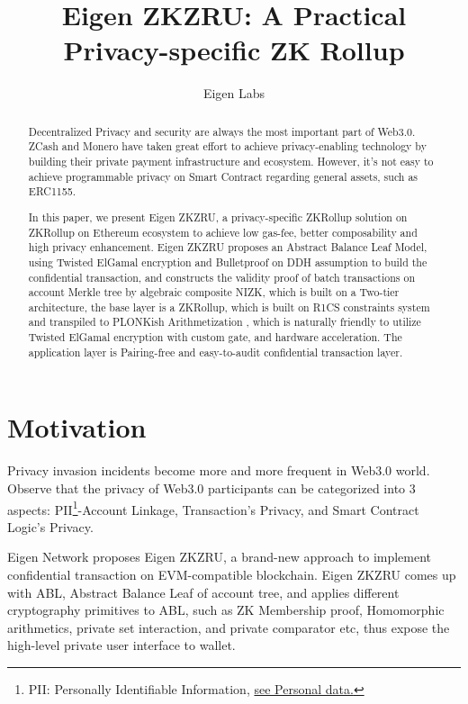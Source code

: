 \documentclass{article}
\title{Eigen ZKZRU: A Practical Privacy-specific ZK Rollup}
\author{Eigen Labs}
\begin{document}
\maketitle


\begin{abstract}
Decentralized Privacy and security are always the most important part of Web3.0. ZCash and Monero have taken great effort to achieve privacy-enabling technology by building their private payment infrastructure and ecosystem. However, it's not easy to achieve programmable privacy on Smart Contract regarding general assets, such as ERC1155.

In this paper, we present Eigen ZKZRU, a privacy-specific ZKRollup solution on ZKRollup on Ethereum ecosystem to achieve low gas-fee, better composability and high privacy enhancement. Eigen ZKZRU proposes an Abstract Balance Leaf Model, using Twisted ElGamal encryption \cite{chen2020pgc} and Bulletproof \cite{bunz2018bulletproofs} on DDH assumption to build the confidential transaction, and constructs the validity proof of batch transactions on account Merkle tree by algebraic composite NIZK, which is built on a Two-tier architecture, the base layer is a ZKRollup, which is built on R1CS constraints system and transpiled to PLONKish Arithmetization \cite{gabizon2019plonk}, which is naturally friendly to utilize Twisted ElGamal encryption with custom gate, and hardware acceleration. The application layer is Pairing-free and easy-to-audit confidential transaction layer. 


\end{abstract}

\section{Motivation}

Privacy invasion incidents become more and more frequent in Web3.0 world. Observe that the privacy of Web3.0 participants can be categorized into 3 aspects: PII\footnote{PII: Personally Identifiable Information, \href{https://en.wikipedia.org/wiki/Personal_data}{see Personal data.}}-Account Linkage, Transaction's Privacy, and Smart Contract Logic's Privacy.

Eigen Network proposes Eigen ZKZRU, a brand-new approach to implement confidential transaction on EVM-compatible blockchain. Eigen ZKZRU comes up with ABL, Abstract Balance Leaf of account tree, and applies different cryptography primitives to ABL, such as ZK Membership proof, Homomorphic arithmetics, private set interaction, and private comparator etc, thus expose the high-level private user interface to wallet. 
\end{document}
